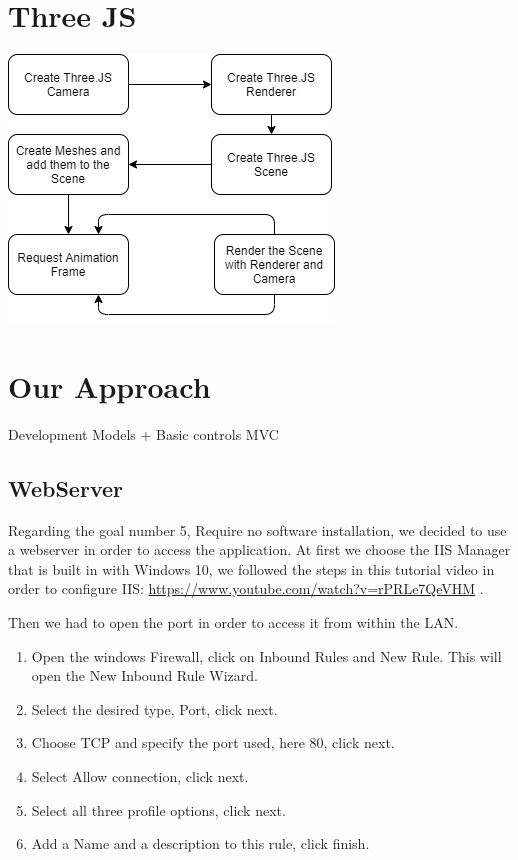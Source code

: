\documentclass{scrartcl}
\begin{document}
\section{Three JS}

\begin{center}
  \includegraphics[scale=0.5]{./basic_threejs_rendering}
\end{center}

\section{Our Approach}

Development
Models + Basic controls
MVC
\subsection{WebServer}
Regarding the goal number 5, Require no software installation, we decided to use a webserver in order to access the application. At first we choose the IIS Manager that is built in with Windows 10, 
we followed the steps in this tutorial video in order to configure IIS: \url{https://www.youtube.com/watch?v=rPRLe7QeVHM} .

Then we had to open the port in order to access it from within the LAN.
\begin{enumerate}
  \item Open the windows Firewall, click on Inbound Rules and New Rule. This will open the New Inbound Rule Wizard.
  \item Select the desired type, Port, click next.
  \item Choose TCP and specify the port used, here 80, click next.
  \item Select Allow connection, click next.
  \item Select all three profile options, click next.
  \item Add a Name and a description to this rule, click finish.
\end{enumerate}
\end{document}
